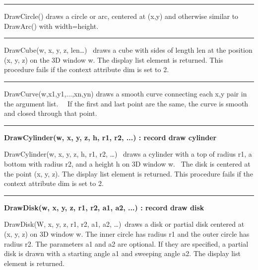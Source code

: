 \bigskip\hrule\vspace{0.1cm}

\noindent
\textsf{DrawCircle()} draws a circle or arc, centered at
(\textsf{x},\textsf{y}) and otherwise similar to \textsf{DrawArc()}
with \textsf{width=height}.

\bigskip\hrule\vspace{0.1cm}

\noindent
\textsf{DrawCube(w, x, y, z, len{\dots}) \ }draws a cube with sides of
length \textsf{len} at the position (\textsf{x}, \textsf{y},
\textsf{z}) on the 3D window \textsf{w}. The display list element is
returned. This procedure fails if the context attribute \textsf{dim} is
set to 2. 

\bigskip\hrule\vspace{0.1cm}

\noindent
\textsf{DrawCurve(w,x1,y1,...,xn,yn)} draws a smooth curve connecting
each \textsf{x,y} pair in the argument list. \ \ If the first and last
point are the same, the curve is smooth and closed through that point.

\bigskip\hrule\vspace{0.1cm}
\noindent
{\bf DrawCylinder(w, x, y, z, h, r1, r2, ...) : record \hfill draw cylinder}

\noindent
\textsf{DrawCylinder(w, x, y, z, h, r1, r2, {\dots})} \ draws a cylinder
with a top of radius \textsf{r1}, a bottom with radius \textsf{r2}, and
a height \textsf{h} on 3D window \textsf{w}. \ The disk is centered at
the point (\textsf{x}, \textsf{y}, \textsf{z}). The display list
element is returned. This procedure fails if the context attribute
\textsf{dim} is set to 2.

\bigskip\hrule\vspace{0.1cm}
\noindent
{\bf DrawDisk(w, x, y, z, r1, r2, a1, a2, ...) : record \hfill draw disk}

\noindent
\textsf{DrawDisk(W, x, y, z, r1, r2, a1, a2, {\dots})}\texttt{ }draws a
disk or partial disk centered at (\textsf{x}, \textsf{y}, \textsf{z})
on 3D window \textsf{w}. The inner circle has radius \textsf{r1} and
the outer circle has radius \textsf{r2}. The parameters \textsf{a1} and
\textsf{a2} are optional. If they are specified, a partial disk is
drawn with a starting angle \textsf{a1} and sweeping angle \textsf{a2}.
The display list element is returned.

